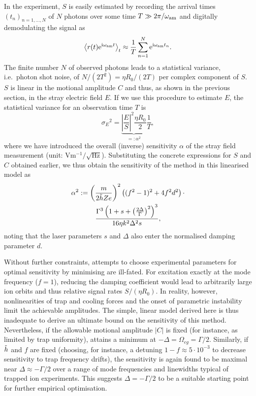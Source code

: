 \documentclass[pra,twocolumn]{revtex4-2}
\begin{document}
In the experiment, $S$ is easily estimated by recording the arrival times $(t_n)_{n = 1, \ldots, N}$ of $N$ photons over some time $T \gg 2 \pi / \omega_{\textrm{am}}$ and digitally demodulating the signal as
\begin{equation}
	\left\langle r(t) \mathrm{e}^{\mathrm{i} \omega_{\textrm{am}} t} \right\rangle_t \approx \frac{1}{T} \sum_{n=1}^{N} \mathrm{e}^{\mathrm{i} \omega_{\textrm{am}} t_n}.
	\label{eq:timestamp-demodulation}
\end{equation}
The finite number $N$ of observed photons leads to a statistical variance, i.e.~photon shot noise, of $N / (2 T^2) = \eta R_0 / (2 T)$ per complex component of $S$.
$S$ is linear in the motional amplitude $C$ and thus, as shown in the previous section, in the stray electric field $E$.
If we use this procedure to estimate $E$, the statistical variance for an observation time $T$ is
\begin{equation}
	{\sigma_E}^2 = \underbrace{\left|\frac{E}{S}\right|^2 \frac{\eta R_0}{2}}_{=: \alpha^2} \frac{1}{T},
\end{equation}
where we have introduced the overall (inverse) sensitivity $\alpha$ of the stray field measurement (unit: $\si{\volt \meter^{-1}} / \sqrt{\si{\hertz}}$).
Substituting the concrete expressions for $S$ and $C$ obtained earlier, we thus obtain the sensitivity of the method in this linearised model as
\begin{equation}
	\begin{gathered}
	\alpha^2 := \left(\frac{m}{2 \tilde{h} Z e}\right)^2 \left((f^2 - 1)^2 + 4 f^2 d^2\right) \cdot \\ \frac{\Gamma^3 \left(1 + s + \left(\frac{2 \Delta}{\Gamma}\right)^2\right)^3}{16 \eta k^2 \Delta^2 s},
	\end{gathered}
	\label{eq:field-error}
\end{equation}
noting that the laser parameters $s$ and $\Delta$ also enter the normalised damping parameter $d$.

Without further constraints, attempts to choose experimental parameters for optimal sensitivity by minimising  are ill-fated.
For excitation exactly at the mode frequency ($f = 1$), reducing the damping coefficient would lead to arbitrarily large ion orbits and thus relative signal rates $S / (\eta R_0)$.
In reality, however, nonlinearities of trap and cooling forces \cite{akermanSingleionNonlinearMechanical2010} and the onset of parametric instability limit the achievable amplitudes.
The simple, linear model derived here is thus inadequate to derive an ultimate bound on the sensitivity of this method.
Nevertheless, if the allowable motional amplitude $|C|$ is fixed (for instance, as limited by trap uniformity),  attains a minimum at $-\Delta = \Omega_{eg} = \Gamma / 2$.
Similarly, if $\tilde{h}$ and $f$ are fixed (choosing, for instance, a detuning $1 - f \approx 5 \cdot 10^{-3}$ to decrease sensitivity to trap frequency drifts), the sensitivity is again found to be maximal near $\Delta \approx - \Gamma / 2$ over a range of mode frequencies and linewidths typical of trapped ion experiments.
This suggests $\Delta = -\Gamma / 2$ to be a suitable starting point for further empirical optimisation.
\end{document}
